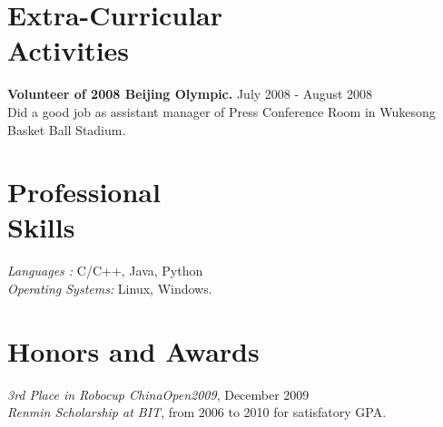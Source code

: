 \documentclass[margin]{res}
\begin{document}
\begin{resume}
\section{Extra-Curricular \\ Activities} 
				{ \bf Volunteer of 2008 Beijing Olympic.} \hfill July 2008 - August 2008 \\  		
                 Did a good job as assistant manager of Press Conference Room in Wukesong Basket Ball Stadium.

\section{Professional \\ Skills} {\sl Languages :} C/C++, Java, Python \\
                {\sl Operating Systems:} Linux, Windows.

\section{Honors and Awards }             
             {\it 3rd Place in Robocup ChinaOpen2009}, 	December	2009 \\             			
			 {\it Renmin Scholarship at BIT}, from 2006 to 2010 for satisfatory GPA.			  				

\end{resume}
\end{document}
